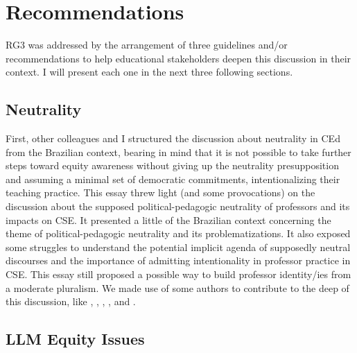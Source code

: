 \section{Recommendations}
\label{disc-sec:recommendations}

\gls{RG}3 was addressed by the arrangement of three guidelines and/or recommendations to help educational stakeholders deepen this discussion in their context. I will present each one in the next three following sections.

\subsection{Neutrality}
\label{disc-ss:neutrality}

First, other colleagues and I
structured the discussion about neutrality in CEd \cite{bispojr:2022-educomp} from the Brazilian context, bearing in mind that it is not possible to take further steps toward equity awareness without giving up the neutrality presupposition and assuming a minimal set of democratic commitments, intentionalizing their teaching practice. This essay threw light (and some provocations) on the discussion about the supposed political-pedagogic neutrality of professors and its impacts on \gls{CSE}. It presented a little of the Brazilian context concerning the theme of political-pedagogic neutrality and its problematizations. It also exposed some struggles to understand the potential implicit agenda of supposedly neutral discourses and the importance of admitting intentionality in professor practice in \gls{CSE}. This essay still proposed a possible way to build professor identity/ies from a moderate pluralism. We made use of some authors to contribute to the deep of this discussion, like , , , , and .

\subsection{LLM Equity Issues}
\label{disc-ss:llm-equity-issues}

